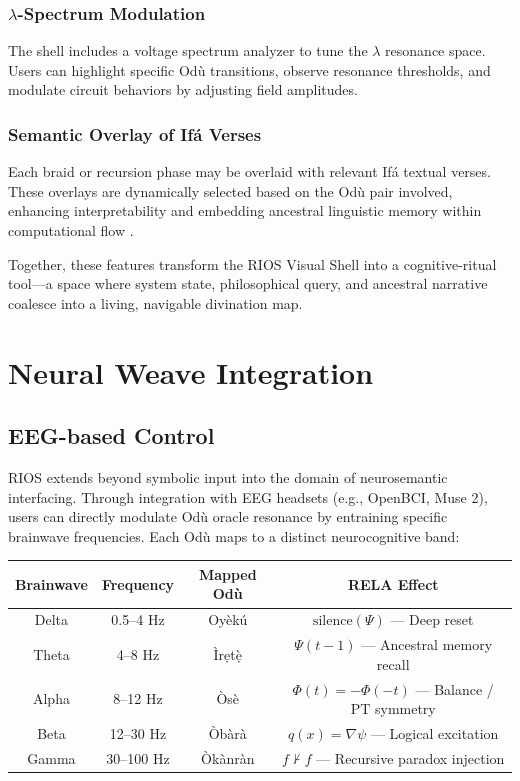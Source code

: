 \documentclass[12]{amsart}
\theoremstyle{plain}
\begin{document}
\subsubsection*{$\lambda$-Spectrum Modulation}
The shell includes a voltage spectrum analyzer to tune the $\lambda$ resonance space. Users can highlight specific Odù transitions, observe resonance thresholds, and modulate circuit behaviors by adjusting field amplitudes.

\subsubsection*{Semantic Overlay of Ifá Verses}
Each braid or recursion phase may be overlaid with relevant Ifá textual verses. These overlays are dynamically selected based on the Odù pair involved, enhancing interpretability and embedding ancestral linguistic memory within computational flow \cite{abiodun1994yoruba, drewal1992african}.

Together, these features transform the RIOS Visual Shell into a cognitive-ritual tool—a space where system state, philosophical query, and ancestral narrative coalesce into a living, navigable divination map.

\section{Neural Weave Integration}

\subsection{EEG-based Control}

RIOS extends beyond symbolic input into the domain of neurosemantic interfacing. Through integration with EEG headsets (e.g., OpenBCI, Muse 2), users can directly modulate Odù oracle resonance by entraining specific brainwave frequencies. Each Odù maps to a distinct neurocognitive band:

\begin{center}
\begin{tabular}{|c|c|c|c|}
\hline
\textbf{Brainwave} & \textbf{Frequency} & \textbf{Mapped Odù} & \textbf{RELA Effect} \\
\hline
Delta & 0.5–4 Hz & Oyèkú & $\text{silence}(\Psi)$ — Deep reset \\
Theta & 4–8 Hz & Ìrẹtẹ̀ & $\Psi(t-1)$ — Ancestral memory recall \\
Alpha & 8–12 Hz & Òsè & $\Phi(t) = -\Phi(-t)$ — Balance / PT symmetry \\
Beta & 12–30 Hz & Òbàrà & $q(x) = \nabla \psi$ — Logical excitation \\
Gamma & 30–100 Hz & Òkànràn & $f \nvdash f$ — Recursive paradox injection \\
\hline
\end{tabular}
\end{center}
\end{document}
